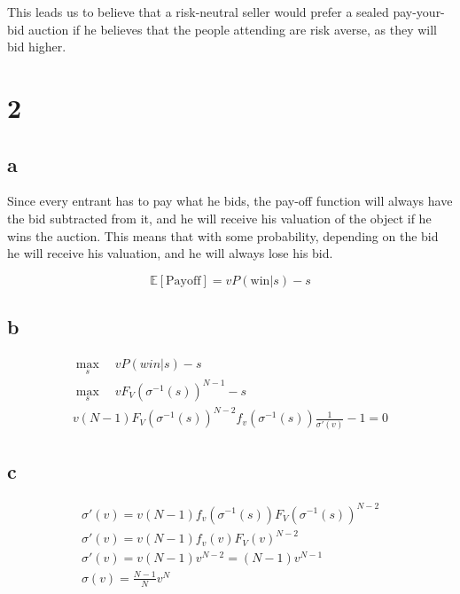 \documentclass[10pt]{paper}
\begin{document}



This leads us to believe that a risk-neutral seller would prefer a
sealed pay-your-bid auction if he believes that the people attending
are risk averse, as they will bid higher. 

\section*{2}

\subsection*{a}

Since every entrant has to pay what he bids, the pay-off function
will always have the bid subtracted from it, and he will receive his
valuation of the object if he wins the auction. This means that with
some probability, depending on the bid he will receive his valuation,
and he will always lose his bid.

$$\mathbb{E}[\text{Payoff}] = v P( \text{win}|s ) - s$$

\subsection*{b}

\begin{align*}
  \max_s\quad v P( win | s ) - s\\
  \max_s \quad v F_V( \sigma^{-1}(s) )^{N-1} - s\\
  v (N-1) F_V( \sigma^{-1}(s) )^{N-2} f_v (\sigma^{-1}(s) ) \frac{1}{\sigma'(v)} - 1 = 0
\end{align*}

\subsection*{c}


\begin{align*}
  \sigma'(v) = v(N-1)f_v( \sigma^{-1}(s)) F_V(\sigma^{-1}(s))^{N-2}\\
  \sigma'(v) = v(N-1)f_v(v) F_V(v)^{N-2}\\
  \sigma'(v) = v(N-1) v^{N-2} = (N-1)v^{N-1}\\
  \sigma(v) = \frac{N-1}{N}v^N
\end{align*}
\end{document}

